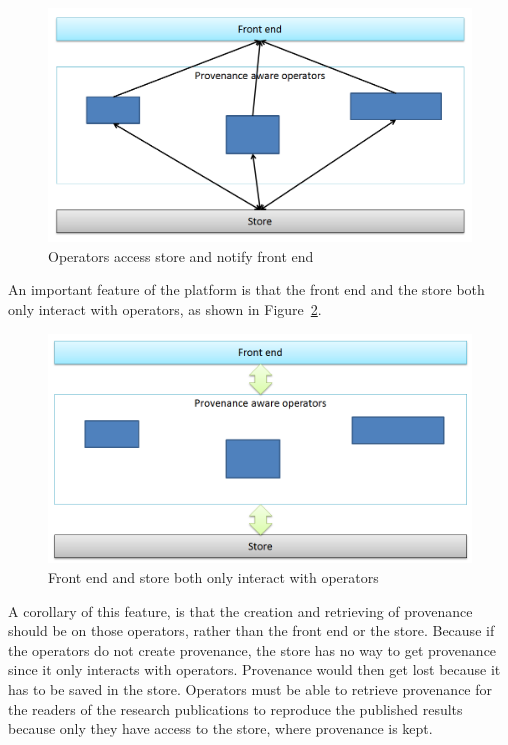 \begin{figure}
	\includegraphics[width=\textwidth]{execute.png}
	\caption{Operators access store and notify front end}
	\label{fig:execute}
\end{figure}
An important feature of the platform is that the front end and the store both only interact with operators, as shown in Figure~\ref{fig:platform}.
\begin{figure}
	\includegraphics[width=\textwidth]{platform.png}
	\caption{Front end and store both only interact with operators}
	\label{fig:platform}
\end{figure}
A corollary of this feature, is that the creation and retrieving of provenance should be on those operators, rather than the front end or the store. Because if the operators do not create provenance, the store has no way to get provenance since it only interacts with operators. Provenance would then get lost because it has to be saved in the store. Operators must be able to retrieve provenance for the readers of the research publications to reproduce the published results because only they have access to the store, where provenance is kept.

